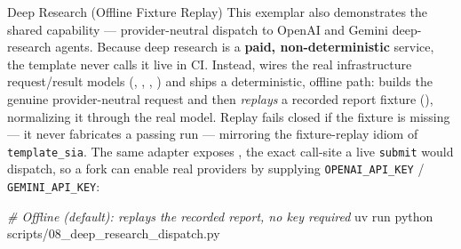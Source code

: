 \documentclass[
  ignorenonframetext,
]{beamer}
\newenvironment{Shaded}{}{}
\newcommand{\CommentTok}[1]{\textcolor[rgb]{0.38,0.63,0.69}{\textit{#1}}}
\newcommand{\ExtensionTok}[1]{#1}
\newcommand{\NormalTok}[1]{#1}
\begin{document}
\begin{frame}{Deep Research (Offline Fixture
Replay)}
\protect{}\label{deep-research-offline-fixture-replay}
This exemplar also demonstrates the shared
 capability ---
provider-neutral dispatch to OpenAI and Gemini deep-research agents.
Because deep research is a \textbf{paid, non-deterministic} service, the
template never calls it live in CI. Instead,
 wires the real
infrastructure request/result models (,
, ,
) and ships a deterministic, offline path:
 builds the genuine
provider-neutral request and then \emph{replays} a recorded report
fixture (),
normalizing it through the real  model.
Replay fails closed if the fixture is missing --- it never fabricates a
passing run --- mirroring the fixture-replay idiom of
\texttt{template\_sia}. The same adapter exposes
, the exact call-site a live
\texttt{submit} would dispatch, so a fork can enable real providers by
supplying \texttt{OPENAI\_API\_KEY} / \texttt{GEMINI\_API\_KEY}:

\begin{Shaded}
\begin{Highlighting}[]
\CommentTok{\# Offline (default): replays the recorded report, no key required}
\ExtensionTok{uv}\NormalTok{ run python scripts/08\_deep\_research\_dispatch.py}
\end{Highlighting}
\end{Shaded}
\end{frame}
\end{document}
